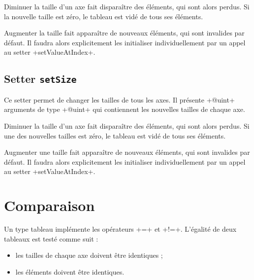 Diminuer la taille d'un axe fait disparaître des éléments, qui sont alors perdus. Si la nouvelle taille est zéro, le tableau est vidé de tous ses éléments.

Augmenter la taille fait apparaître de nouveaux éléments, qui sont invalides par défaut. Il faudra alors explicitement les initialiser individuellement par un appel au setter \ggs+setValueAtIndex+.




\subsection{Setter \texttt{setSize}}

Ce setter permet de changer les tailles de tous les axes. Il présente \ggs+@uint+ arguments de type \ggs+@uint+ qui contiennent les nouvelles tailles de chaque axe.

Diminuer la taille d'un axe fait disparaître des éléments, qui sont alors perdus. Si une des nouvelles tailles est zéro, le tableau est vidé de tous ses éléments.

Augmenter une taille fait apparaître de nouveaux éléments, qui sont invalides par défaut. Il faudra alors explicitement les initialiser individuellement par un appel au setter \ggs+setValueAtIndex+.


\section{Comparaison}

Un type tableau implémente les opérateurs \ggs+=+ et \ggs+!=+. L'égalité de deux tableaux est testé comme suit :
\begin{itemize}
  \item les tailles de chaque axe doivent être identiques ;
  \item les éléments doivent être identiques.
\end {itemize}
